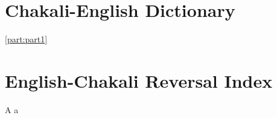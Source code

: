 \documentclass[output=book
	      ,modfonts
	      ,nonflat
		]{langsci/langscibook}
\begin{document}
       
\maketitle                
\frontmatter

% 
%     
%   
%     

\tableofcontents      
\mainmatter       

%      
   

\newpage
\part{Chakali-English Dictionary}
 \ref{part:part1}



\newcommand{\headrulewidth}{0pt}
\setlength{\columnsep}{3em}
\setlength{\parindent}{0pt}

\begin{letter}{}
% 

\end{letter}

\renewcommand{\lsgloss}[1]{\textbf{#1}\markboth{#1}{#1}}
\renewcommand{\definition}[1]{\textbf{#1}\markboth{#1}{#1}}
\renewcommand{\headword}[1]{{#1}}
\renewcommand{\homograph}[1]{\textsuperscript{#1}}
\renewcommand{\sensenr}[1]{\textsubscript{#1}}



\newpage
 \part{English-Chakali Reversal Index}
\begin{letter}{A a}
  
\end{letter}
\end{document}

